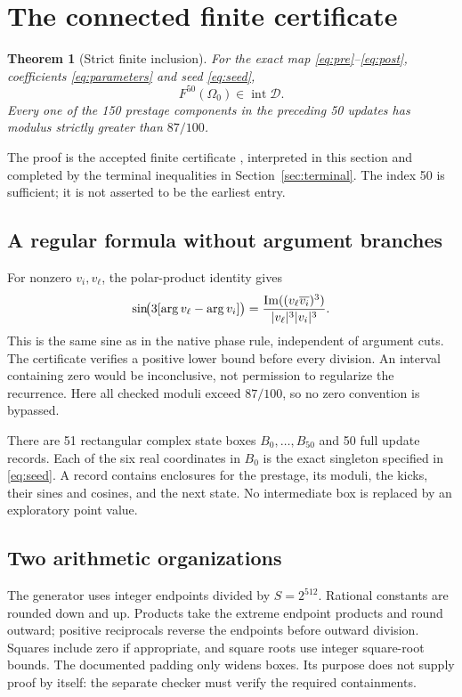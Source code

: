 \documentclass[11pt,a4paper]{article}
\numberwithin{equation}{section}
\newtheorem{theorem}{Theorem}[section]
\theoremstyle{remark}\newtheorem{remark}[theorem]{Remark}
\newcommand{\D}{\mathcal D}\newcommand{\Q}{\mathcal Q}
\begin{document}
\section{The connected finite certificate}\label{sec:certificate}
\begin{theorem}[Strict finite inclusion]\label{thm:capture}
For the exact map \eqref{eq:pre}--\eqref{eq:post}, coefficients \eqref{eq:parameters} and seed \eqref{eq:seed},
\begin{equation}
F^{50}(\Omega_0)\in\operatorname{int}\D.\label{eq:capture}
\end{equation}
Every one of the 150 prestage components in the preceding 50 updates has modulus strictly greater than $87/100$.
\end{theorem}
The proof is the accepted finite certificate \cite{capture}, interpreted in this section and completed by the terminal inequalities in Section~\ref{sec:terminal}. The index 50 is sufficient; it is not asserted to be the earliest entry.

\subsection{A regular formula without argument branches}\label{sec:regular}
For nonzero $v_i,v_\ell$, the polar-product identity gives
\begin{equation}
\sin\!\bigl(3[\arg v_\ell-\arg v_i]\bigr)
=\frac{\operatorname{Im}((v_\ell\overline{v_i})^3)}{|v_\ell|^3|v_i|^3}.
\label{eq:identity}
\end{equation}
This is the same sine as in the native phase rule, independent of argument cuts. The certificate verifies a positive lower bound before every division. An interval containing zero would be inconclusive, not permission to regularize the recurrence. Here all checked moduli exceed $87/100$, so no zero convention is bypassed.

There are 51 rectangular complex state boxes $B_0,\ldots,B_{50}$ and 50 full update records. Each of the six real coordinates in $B_0$ is the exact singleton specified in \eqref{eq:seed}. A record contains enclosures for the prestage, its moduli, the kicks, their sines and cosines, and the next state. No intermediate box is replaced by an exploratory point value.

\subsection{Two arithmetic organizations}\label{sec:arithmetic}
The generator uses integer endpoints divided by $S=2^{512}$. Rational constants are rounded down and up. Products take the extreme endpoint products and round outward; positive reciprocals reverse the endpoints before outward division. Squares include zero if appropriate, and square roots use integer square-root bounds. The documented padding only widens boxes. Its purpose does not supply proof by itself: the separate checker must verify the required containments.
\end{document}

